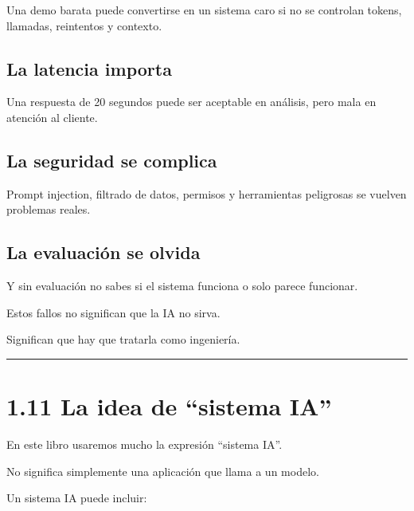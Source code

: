 Una demo barata puede convertirse en un sistema caro si no se controlan
tokens, llamadas, reintentos y contexto.

\subsection{La latencia importa}\label{la-latencia-importa}

Una respuesta de 20 segundos puede ser aceptable en análisis, pero mala
en atención al cliente.

\subsection{La seguridad se complica}\label{la-seguridad-se-complica}

Prompt injection, filtrado de datos, permisos y herramientas peligrosas
se vuelven problemas reales.

\subsection{La evaluación se olvida}\label{la-evaluaciuxf3n-se-olvida}

Y sin evaluación no sabes si el sistema funciona o solo parece
funcionar.

Estos fallos no significan que la IA no sirva.

Significan que hay que tratarla como ingeniería.

\begin{center}\rule{0.5\linewidth}{0.5pt}\end{center}

\section{1.11 La idea de ``sistema IA''}\label{la-idea-de-sistema-ia}

En este libro usaremos mucho la expresión ``sistema IA''.

No significa simplemente una aplicación que llama a un modelo.

Un sistema IA puede incluir:


